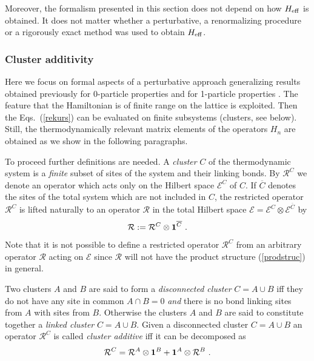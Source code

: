 Moreover, the formalism presented in this section does not
depend on how $H_{\rm eff}$ is obtained. It does not matter
whether a perturbative, a renormalizing procedure or a
rigorously exact method was used to obtain $H_{\rm eff}$.


\subsubsection{Cluster additivity}
\label{clustadditiv}
Here we focus on formal aspects of a perturbative
approach generalizing results obtained previously for
0-particle properties \cite{gelfa90} and for  1-particle properties
 \cite{gelfa96}. The feature that the Hamiltonian is of finite range
on the lattice is exploited. Then the  Eqs.~(\ref{rekurs}) can be
evaluated on finite subsystems (clusters, see below). Still,
the thermodynamically relevant matrix elements of the operators $H_n$ are 
obtained as we show in the following paragraphs.

To proceed further definitions are needed.  A {\it cluster} $C$ of the 
thermodynamic system is a {\it finite} subset of sites  of the system
and their linking bonds. By  ${\mathcal R}^C$ we denote an operator which
acts only on the Hilbert space ${\mathcal E}^C$ of $C$. If $\overline{C}$
denotes the sites of the total system which are not included in $C$, the
restricted operator ${\mathcal R}^C$ is lifted naturally to an
operator ${\mathcal R}$ in the total Hilbert space 
${\mathcal E}={\mathcal E}^C\otimes {\mathcal E}^{\overline{C}}$ by
\begin{equation}
\label{prodstruc}
{\mathcal R} := {\mathcal R}^C \otimes {\bf 1}^{\overline{C}}\ .
\end{equation}
Note that it is not possible to define a restricted operator 
${\mathcal R}^C$ from an arbitrary operator ${\mathcal R}$ acting on 
${\mathcal E}$ since ${\mathcal R}$ will not have the 
product structure (\ref{prodstruc}) in general.

Two clusters $A$ and $B$ are said to form a {\it disconnected cluster} 
$C=A\cup B$ iff they do not have any site in common $A\cap B = 0$
{\it and} there is no bond linking sites from $A$ with sites from $B$. 
Otherwise the clusters $A$ and  $B$ are said to constitute together a 
{\it linked cluster} $C=A\cup B$. 
Given a disconnected cluster $C=A\cup B$ an operator ${\mathcal R}^C$ is called
{\it cluster additive} iff it can be decomposed as
\begin{equation}
  \label{clustadd}
  {\mathcal R}^C={\mathcal R}^A\otimes{\bf 1}^B  + {\bf 1}^A\otimes
  {\mathcal R}^B \ .
\end{equation}


